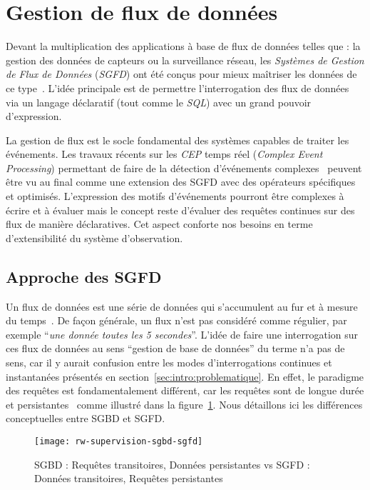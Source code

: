 \section{Gestion de flux de données}\label{sec:rw:supervision:datastream}
Devant la multiplication des applications à base de flux de données telles que : la gestion des données de capteurs ou la surveillance réseau, les \textit{Systèmes de Gestion de Flux de Données} (\textit{SGFD}) ont été conçus pour mieux maîtriser les données de ce type~\cite{Madden:tag, Yao:cougar, Cranor:gigascope}. L'idée principale est de permettre l'interrogation des flux de données via un langage déclaratif (tout comme le \textit{SQL}) avec un grand pouvoir d'expression.

La gestion de flux est le socle fondamental des systèmes capables de traiter les événements. Les travaux récents sur les \textit{CEP} temps réel (\textit{Complex Event Processing}) permettant de faire de la détection d'événements complexes~\cite{Brenna:cayuga} peuvent être vu au final comme une extension des SGFD avec des opérateurs spécifiques et optimisés. L'expression des motifs d'événements pourront être complexes à écrire et à évaluer mais le concept reste d'évaluer des requêtes continues sur des flux de manière déclaratives. Cet aspect conforte nos besoins en terme d'extensibilité du système d'observation.

\subsection{Approche des SGFD}
Un flux de données est une série de données qui s'accumulent au fur et à mesure du temps~\cite{Golab:issues}. De façon générale, un flux n'est pas considéré comme régulier, par exemple \enquote{\it une donnée toutes les 5 secondes}. L'idée de faire une interrogation sur ces flux de données au sens \enquote{gestion de base de données} du terme n'a pas de sens, car il y aurait confusion entre les modes d'interrogations continues et instantanées présentés en section~\ref{sec:intro:problematique}. En effet, le paradigme des requêtes est fondamentalement différent, car les requêtes sont de longue durée et persistantes~\cite{Chen:niagaracq} comme illustré dans la figure~\ref{fig:rw:supervision:sgbd-sgfd}. Nous détaillons ici les différences conceptuelles entre SGBD et SGFD.
\begin{figure}[ht]
    \centering
    \texttt{[image: rw-supervision-sgbd-sgfd]}
    \caption{SGBD : Requêtes transitoires, Données persistantes vs SGFD : Données transitoires, Requêtes persistantes~\protect\cite{Gurgen:sstreamware}}\label{fig:rw:supervision:sgbd-sgfd}
\end{figure}

